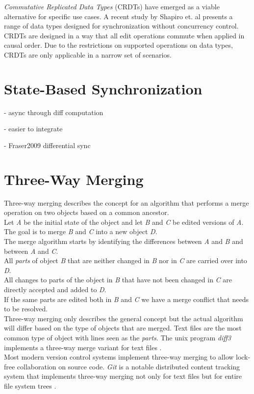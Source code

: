 \emph{Commutative Replicated Data Types} (CRDTs) have emerged as a viable alternative for specific use cases.
A recent study by Shapiro et. al \cite{Shapiro:2011wy} presents a range of data types designed for synchronization without concurrency control.
CRDTs are designed in a way that all edit operations commute when applied in causal order.
Due to the restrictions on supported operations on data types, CRDTs are only applicable in a narrow set of scenarios.

\section{State-Based Synchronization}
- async through diff computation

- easier to integrate

- Fraser2009 differential sync

\section{Three-Way Merging}
Three-way merging describes the concept for an algorithm that performs a merge operation on two objects based on a common ancestor.\\
Let \emph{A} be the initial state of the object and let \emph{B} and \emph{C} be edited versions of \emph{A}.
The goal is to merge \emph{B} and \emph{C} into a new object \emph{D}.\\
The merge algorithm starts by identifying the differences between \emph{A} and \emph{B} and between \emph{A} and \emph{C}.\\
All \emph{parts} of object \emph{B} that are neither changed in \emph{B} nor in \emph{C} are carried over into \emph{D}.\\
All changes to parts of the object in \emph{B} that have not been changed in \emph{C} are directly accepted and added to \emph{D}.\\
If the same parts are edited both in \emph{B} and \emph{C} we have a merge conflict that needs to be resolved.\\

Three-way merging only describes the general concept but the actual algorithm will differ based on the type of objects that are merged.
Text files are the most common type of object with lines seen as the \emph{parts}.
The unix program \emph{diff3} implements a three-way merge variant for text files \cite{diff3}.\\
Most modern version control systems implement three-way merging to allow lock-free collaboration on source code.
\emph{Git} is a notable distributed content tracking system that implements three-way merging not only for text files but for entire file system trees \cite{git}.\\


